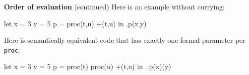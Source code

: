 \begin{minipage}[t]{\sw}
\slidenumber
\LARGE
{\bf Order of evaluation} (continued)\exx
Here is an example without currying:
\begin{qv}
let
  x = 3
  y = 5
  p = proc(t,u) +(t,u)
in
  .p(x,y) %
\end{qv}
Here is semantically equivalent code
that has exactly one formal parameter per \verb'proc':
\begin{qv}
let
  x = 3
  y = 5
  p = proc(t) proc(u) +(t,u)
in
  ..p(x)(y)
\end{qv}
\end{minipage}
